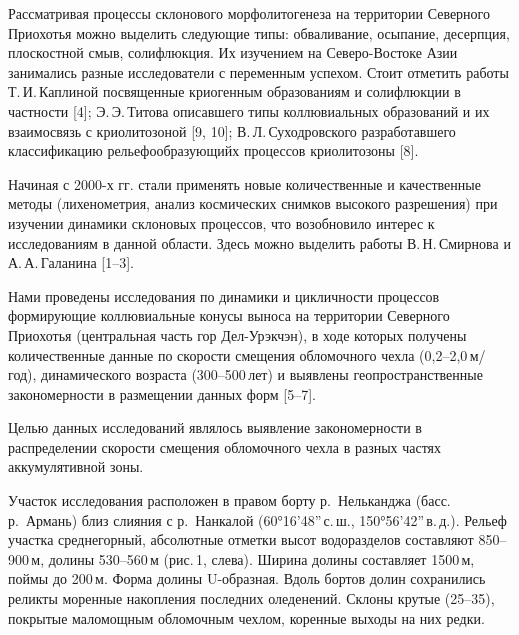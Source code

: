  

\makeProcTitle
{}

Рассматривая процессы склонового морфолитогенеза на территории Северного Приохотья
можно выделить следующие типы: обваливание, осыпание, десерпция, плоскостной смыв, солифлюкция.
Их изучением на Северо-Востоке Азии занимались разные исследователи с переменным успехом.
Стоит отметить работы Т.\,И.\,Каплиной посвященные криогенным образованиям
и солифлюкции в частности [4]; Э.\,Э.\,Титова описавшего типы коллювиальных образований
и их взаимосвязь с криолитозоной [9, 10]; В.\,Л.\,Суходровского разработавшего классификацию рельефообразующийх процессов криолитозоны [8].

Начиная с 2000-х гг. стали применять новые количественные и качественные методы (лихенометрия, анализ космических снимков высокого разрешения) при изучении динамики склоновых процессов,
что возобновило интерес к исследованиям в данной области. Здесь можно выделить работы В.\,Н.\,Смирнова и А.\,А.\,Галанина [1--3].

Нами проведены исследования по динамики и цикличности процессов формирующие коллювиальные конусы выноса на территории Северного Приохотья (центральная часть гор Дел-Урэкчэн), в ходе которых получены количественные данные по скорости смещения обломочного чехла (0,2--2,0\,м/год), динамического возраста (300--500\,лет) и выявлены геопространственные закономерности в размещении данных форм [5--7].

Целью данных исследований являлось выявление закономерности в распределении скорости смещения обломочного чехла в разных частях аккумулятивной зоны.

Участок исследования расположен в правом борту р.~Нельканджа (басс. р.~Армань) близ слияния с р.~Нанкалой (60°16’48”\,с.\,ш., 150°56’42”\,в.\,д.). Рельеф участка среднегорный, абсолютные отметки высот водоразделов составляют 850--900\,м, долины 530--560\,м (рис.\,1, слева). Ширина долины составляет 1500\,м, поймы до 200\,м. Форма долины U-образная. Вдоль бортов долин сохранились реликты моренные накопления последних оледенений. Склоны крутые (25--35\dg), покрытые маломощным обломочным чехлом, коренные выходы на них редки.


